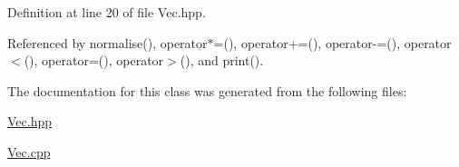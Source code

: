 \-Definition at line 20 of file \-Vec.\-hpp.



\-Referenced by normalise(), operator$\ast$=(), operator+=(), operator-\/=(), operator$<$(), operator=(), operator$>$(), and print().



\-The documentation for this class was generated from the following files\-:\begin{DoxyCompactItemize}
\item 
\hyperlink{Vec_8hpp}{\-Vec.\-hpp}\item 
\hyperlink{Vec_8cpp}{\-Vec.\-cpp}\end{DoxyCompactItemize}
